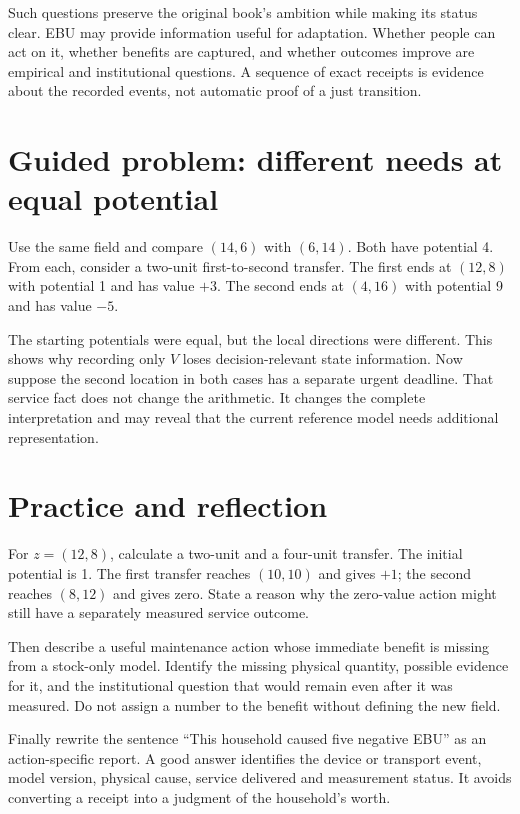 Such questions preserve the original book's ambition while making its status clear. EBU may provide information useful for adaptation. Whether people can act on it, whether benefits are captured, and whether outcomes improve are empirical and institutional questions. A sequence of exact receipts is evidence about the recorded events, not automatic proof of a just transition.

\section{Guided problem: different needs at equal potential}
Use the same field and compare $(14,6)$ with $(6,14)$. Both have potential 4. From each, consider a two-unit first-to-second transfer. The first ends at $(12,8)$ with potential 1 and has value $+3$. The second ends at $(4,16)$ with potential 9 and has value $-5$.

The starting potentials were equal, but the local directions were different. This shows why recording only $V$ loses decision-relevant state information. Now suppose the second location in both cases has a separate urgent deadline. That service fact does not change the arithmetic. It changes the complete interpretation and may reveal that the current reference model needs additional representation.

\section{Practice and reflection}
For $z=(12,8)$, calculate a two-unit and a four-unit transfer. The initial potential is 1. The first transfer reaches $(10,10)$ and gives $+1$; the second reaches $(8,12)$ and gives zero. State a reason why the zero-value action might still have a separately measured service outcome.

Then describe a useful maintenance action whose immediate benefit is missing from a stock-only model. Identify the missing physical quantity, possible evidence for it, and the institutional question that would remain even after it was measured. Do not assign a number to the benefit without defining the new field.

Finally rewrite the sentence ``This household caused five negative EBU'' as an action-specific report. A good answer identifies the device or transport event, model version, physical cause, service delivered and measurement status. It avoids converting a receipt into a judgment of the household's worth.
